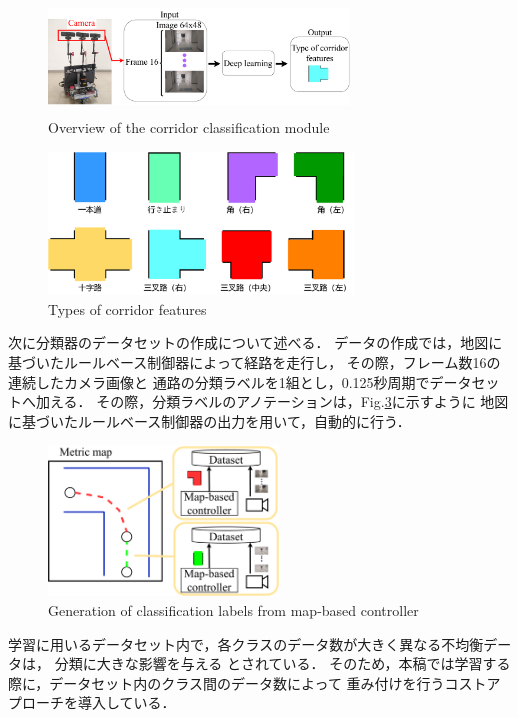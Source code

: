 \documentclass{sice-si}
\begin{document}
\begin{figure}[h!]
    \centering
     \includegraphics[height=30mm,width=80mm]{./figs/corridor_cross.pdf}
     \caption{Overview of the corridor classification module}\label{fig:lrcn}
\end{figure}
\begin{figure}[h!]
    \centering
     \includegraphics[height=38mm]{./figs/corridor.pdf}
     \caption{Types of corridor features}\label{fig:intersection}
\end{figure}
\par
次に分類器のデータセットの作成について述べる．
データの作成では，地図に基づいたルールベース制御器によって経路を走行し，
その際，フレーム数16の連続したカメラ画像と
通路の分類ラベルを1組とし，0.125秒周期でデータセットへ加える．
その際，分類ラベルのアノテーションは，Fig.\ref{fig:map2label}に示すように
地図に基づいたルールベース制御器の出力を用いて，自動的に行う．
\begin{figure}[h!]
    \centering
     \includegraphics[height=40mm]{./figs/map_label.pdf}
     \caption{Generation of classification labels from map-based controller}\label{fig:map2label}
\end{figure}
\par
学習に用いるデータセット内で，各クラスのデータ数が大きく異なる不均衡データは，
分類に大きな影響を与える
\cite{hukin}
とされている．
そのため，本稿では学習する際に，データセット内のクラス間のデータ数によって
重み付けを行うコストアプローチ\cite{cost}を導入している．
\end{document}

